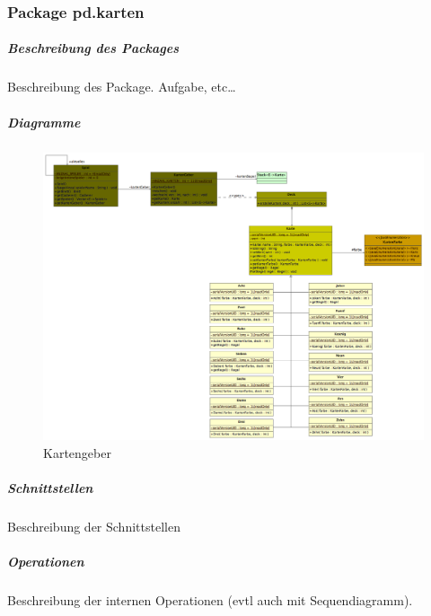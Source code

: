 \documentclass[a4paper,12pt,halfparskip,DIV14]{scrartcl}
\begin{document}
\newpage
\subsubsection{Package pd.karten} %
\label{ssub:package_pd_karten}
\subparagraph{Beschreibung des Packages} %
\label{ssub:beschreibung_des_packages}
Beschreibung des Package. Aufgabe, etc…
\subparagraph{Diagramme} %
\label{ssub:diagramme}
\begin{figure}
	[htp] \centering 
	\includegraphics[width=1\textwidth]{pd_kartengeber.png} \caption{Kartengeber}\label{fig:pd_kartengeber.png} 
\end{figure}
\subparagraph{Schnittstellen} %
\label{ssub:schnittstellen}
Beschreibung der Schnittstellen
\subparagraph{Operationen} %
\label{ssub:operationen}
Beschreibung der internen Operationen (evtl auch mit Sequendiagramm).

\newpage
\end{document}
